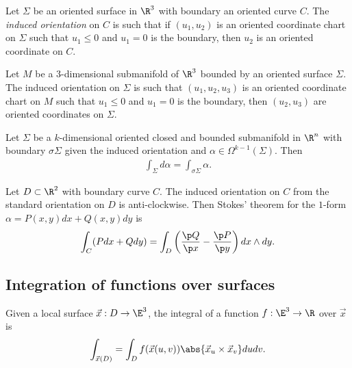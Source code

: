 \documentclass{article}
\begin{document}
\begin{definition}
    Let $\Sigma$ be an oriented surface in $\R^3$ with boundary an oriented curve $C$.
    The \emph{induced orientation} on $C$ is such that if $(u_1,u_2)$ is an oriented coordinate
    chart on $\Sigma$ such that $u_1\leq 0$ and $u_1=0$ is the boundary, then $u_2$ is an
    oriented coordinate on $C$.

    Let $M$ be a $3$-dimensional submanifold of $\R^3$ bounded by
    an oriented surface $\Sigma$. The induced orientation on $\Sigma$ is such that $(u_1,u_2,u_3)$
    is an oriented coordinate chart on $M$ such that $u_1\leq 0$ and $u_1=0$ is the boundary,
    then $(u_2,u_3)$ are oriented coordinates on $\Sigma$.
\end{definition}

\begin{theorem}[Stokes]
    Let $\Sigma$ be a $k$-dimensional oriented closed and bounded submanifold in $\R^n$ with
    boundary $\sigma\Sigma$ given the induced orientation and $\alpha\in\Omega^{k-1}(\Sigma)$.
    Then
    \begin{align*}
        \int_\Sigma d\alpha = \int_{\sigma\Sigma}\alpha.
    \end{align*}
\end{theorem}

\begin{corollary}[Green]
    Let $D\subset\R^2$ with boundary curve $C$. The induced orientation on $C$ from
    the standard orientation on $D$ is anti-clockwise. Then Stokes' theorem for the $1$-form
    $\alpha=P(x,y)dx + Q(x,y)dy$ is
    \begin{align*}
        \int_C(Pdx + Qdy) = \int_D\left(\frac{\p Q}{\p x}-\frac{\p P}{\p y}\right)dx\wedge dy.
    \end{align*}
\end{corollary}

\subsection{Integration of functions over surfaces}

\begin{definition}
    Given a local surface $\vec x:D\to\E^3$, the integral of a
    function $f:\E^3\to\R$ over $\vec x$ is
    \begin{align*}
        \int_{\vec x(D)} = \int_D f(\vec x(u,v))\abs{\vec x_u \times \vec x_v}dudv.
    \end{align*}
\end{definition}
\end{document}
